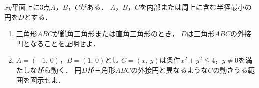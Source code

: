\documentclass[../../main.tex]{subfiles}
\begin{document}
$xy$平面上に3点$A$，$B$，$C$がある．
$A$，$B$，$C$を内部または周上に含む半径最小の円を$D$とする．
\begin{enumerate}
  \item 三角形$ABC$が鋭角三角形または直角三角形のとき，
    $D$は三角形$ABC$の外接円となることを証明せよ．
  \item $A=(-1, \, 0)$，$B=(1, \, 0)$とし
    $C=(x, \, y)$は条件$x^2+y^2\leqq4$，$y\neq0$を満たしながら動く．
    円$D$が三角形$ABC$の外接円と異なるような$C$の動きうる範囲を図示せよ．
\end{enumerate}
\end{document}
